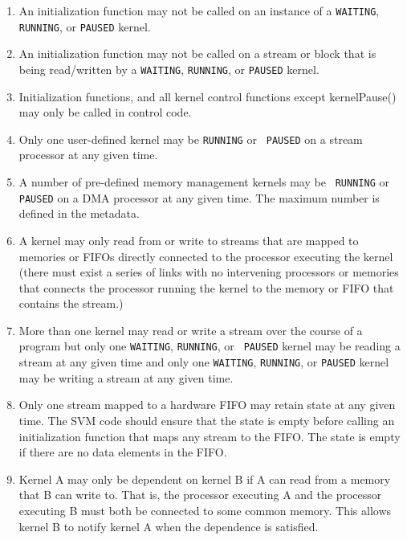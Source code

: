 \begin{enumerate}

\item An initialization function may not be called on an instance of a
{\tt WAITING}, {\tt RUNNING}, or {\tt PAUSED} kernel.

\item An initialization function may not be called on a stream or
block that is being read/written by a {\tt WAITING}, {\tt RUNNING}, or
{\tt PAUSED} kernel.

\item Initialization functions, and all kernel control functions
except kernelPause() may only be called in control code.

\item Only one user-defined kernel may be {\tt RUNNING} or {\tt
PAUSED} on a stream processor at any given time.

\item A number of pre-defined memory management kernels may be {\tt
RUNNING} or {\tt PAUSED} on a DMA processor at any given time.  The
maximum number is defined in the metadata.

\item A kernel may only read from or write to streams that are mapped
to memories or FIFOs directly connected to the processor executing the
kernel (there must exist a series of links with no intervening
processors or memories that connects the processor running the kernel
to the memory or FIFO that contains the stream.)

\item More than one kernel may read or write a stream over the course
of a program but only one {\tt WAITING}, {\tt RUNNING}, or {\tt
PAUSED} kernel may be reading a stream at any given time and only one
{\tt WAITING}, {\tt RUNNING}, or {\tt PAUSED} kernel may be writing a
stream at any given time.

\item Only one stream mapped to a hardware FIFO may retain state at
any given time. The SVM code should ensure that the state is empty
before calling an initialization function that maps any stream to the
FIFO.  The state is empty if there are no data elements in the FIFO.

\item Kernel A may only be dependent on kernel B if A can read from a
memory that B can write to.  That is, the processor executing A and
the processor executing B must both be connected to some common
memory.  This allows kernel B to notify kernel A when the dependence
is satisfied.

\end{enumerate}


